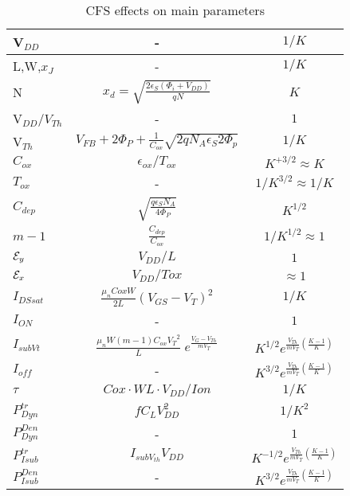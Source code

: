 \documentclass[a4paper, 12pt, twoside, openright]{report}
\begin{document}
\begin{enumerate}
  \begin{table}[H]
  {
  \begin{center}
   {
     \begin{tabular}{||l||c|c||}\hline
      V$_{DD}$ & -& $ {1/K}$\\
      \hline
      L,W,$x_J$       &- & $ {1/K}$\\
      \hline
      N & $x_d=\sqrt{\frac{2\epsilon_S(\Phi_i+V_{DD})}{qN}}$&$ {K}$ \\
      \hline
      V$_{DD}/V_{Th}$ &- & ${1}$\\
      \hline
      V$_{Th}$ & $V_{FB}+2\Phi_P+\frac{1}{C_{ox}}\sqrt{2qN_A\epsilon_S 2\Phi_p}$  & $ {1/K}$\\
      \hline
       $C_{ox}$&  $\epsilon_{ox}/T_{ox}$ &$ {K}^{+3/2}\approx K $\\ 
      \hline
      $T_{ox}$       &- & $ {1/{K}^{3/2}}\approx 1/K$\\
      \hline
       $C_{dep}$&   $\sqrt{\frac{q\epsilon_SN_A}{4\Phi_P}}$ &$K^{1/2}$\\
      \hline
       $ m-1 $&  $ \frac{C_{dep}}{C_{ox}}$ &$ {1/K^{1/2}} \approx 1 $\\ 
      \hline
      ${\cal E}_y$ & $V_{DD}/L$ & $ {1}$\\
      \hline
      ${\cal E}_x$ & $V_{DD}/Tox$ & $ {\approx 1}$\\
      \hline
       $I_{DSsat}$      &$\frac{\mu_n Cox W}{2L}(V_{GS}-V_T)^2$ &$ {1/K}$\\ 
      \hline  
       $I_{ON}$      &- &$ {1}$\\ 
      \hline
       $I_{subVt}$      &$\frac{\mu_n W \left(m-1 \right) C_{ox} {V_T}^2}{L}\;
            e^{\displaystyle \frac{{V_G-V_{Th}}}{ mV_T}}$ &$ K^{1/2} e^{\frac{V_{Th}}{mV_T}
               \left( \frac{K-1}{K}\right)}$\\ 
      \hline  
       $I_{off}$      &- & $ K^{3/2} e^{\frac{V_{Th}}{mV_T}
               \left( \frac{K-1}{K}\right)} $\\ 
      \hline
       $\tau$     &$Cox\cdot WL\cdot V_{DD}/Ion$ &$ {1/K}$\\ 
      \hline 
       $P_{Dyn}^{tr}$      &$fC_LV_{DD}^2$  &$ {1/K^{2}}$\\ 
      \hline 
       $P_{Dyn}^{Den}$      &-&$ {1}$\\ 
      \hline
       $P_{Isub}^{tr}$     &$I_{subV_{th}}V_{DD}$  &$ K^{-1/2} e^{\frac{V_{Th}}{mV_T}
               \left( \frac{K-1}{K}\right)} $\\ 
      \hline 
       $P_{Isub}^{Den}$      &-&$ K^{3/2} e^{\frac{V_{Th}}{mV_T}
               \left( \frac{K-1}{K}\right)} $\\ 
      \hline
     \end{tabular}
  }
\caption{CFS effects on main parameters}
    \end{center}
}
    \end{table}


\end{enumerate}
\end{document}

